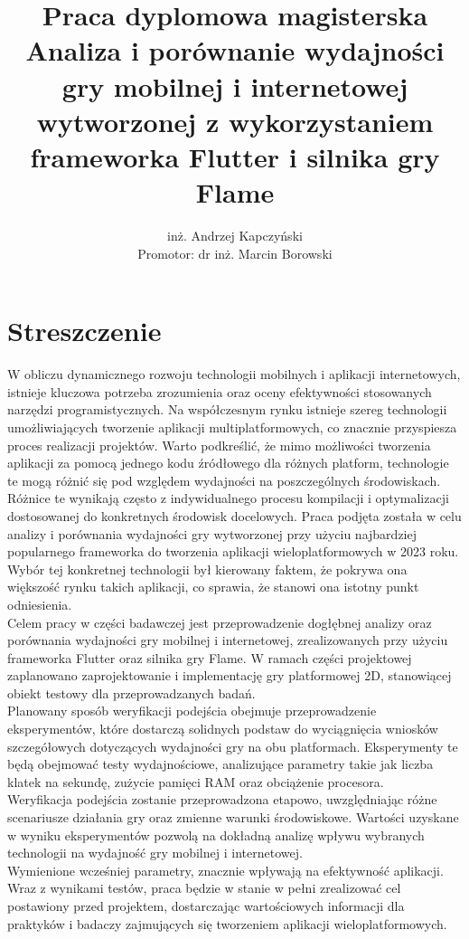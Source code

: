 \documentclass[11pt]{article}
\title{\normalsize Praca dyplomowa magisterska\\[4ex] \LARGE Analiza i porównanie wydajności gry mobilnej i internetowej wytworzonej z wykorzystaniem frameworka Flutter i silnika gry Flame}
\author{inż. Andrzej Kapczyński\\[3ex]
  Promotor: dr inż. Marcin Borowski}
\begin{document}
\maketitle

\section*{Streszczenie} 
W obliczu dynamicznego rozwoju technologii mobilnych i aplikacji internetowych, istnieje kluczowa potrzeba zrozumienia oraz oceny efektywności stosowanych narzędzi programistycznych. Na współczesnym rynku istnieje szereg technologii umożliwiających tworzenie aplikacji multiplatformowych, co znacznie przyspiesza proces realizacji projektów. Warto podkreślić, że mimo możliwości tworzenia aplikacji za pomocą jednego kodu źródłowego dla różnych platform, technologie te mogą różnić się pod względem wydajności na poszczególnych środowiskach. Różnice te wynikają często z indywidualnego procesu kompilacji i optymalizacji dostosowanej do konkretnych środowisk docelowych. Praca podjęta została w celu analizy i porównania wydajności gry wytworzonej przy użyciu najbardziej popularnego frameworka do tworzenia aplikacji wieloplatformowych w 2023 roku. Wybór tej konkretnej technologii był kierowany faktem, że pokrywa ona większość rynku takich aplikacji, co sprawia, że stanowi ona istotny punkt odniesienia.\\

Celem pracy w części badawczej jest przeprowadzenie dogłębnej analizy oraz porównania wydajności gry mobilnej i internetowej, zrealizowanych przy użyciu frameworka Flutter oraz silnika gry Flame. W ramach części projektowej zaplanowano zaprojektowanie i implementację gry platformowej 2D, stanowiącej obiekt testowy dla przeprowadzanych badań.\\

Planowany sposób weryfikacji podejścia obejmuje przeprowadzenie eksperymentów, które dostarczą solidnych podstaw do wyciągnięcia wniosków szczegółowych dotyczących wydajności gry na obu platformach. Eksperymenty te będą obejmować testy wydajnościowe, analizujące parametry takie jak liczba klatek na sekundę, zużycie pamięci RAM oraz obciążenie procesora.\\

Weryfikacja podejścia zostanie przeprowadzona etapowo, uwzględniając różne scenariusze działania gry oraz zmienne warunki środowiskowe. Wartości uzyskane w wyniku eksperymentów pozwolą na dokładną analizę wpływu wybranych technologii na wydajność gry mobilnej i internetowej.\\

Wymienione wcześniej parametry, znacznie wpływają na efektywność aplikacji. Wraz z wynikami testów, praca będzie w stanie w pełni zrealizować cel postawiony przed projektem, dostarczając wartościowych informacji dla praktyków i badaczy zajmujących się tworzeniem aplikacji wieloplatformowych.\\
\end{document}
